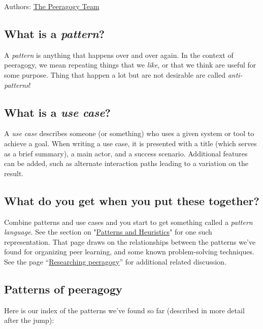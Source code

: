 Authors: \href{http://peeragogy.org/resources/meet-the-team/}{The
Peeragogy Team}

\subsection{What is a \emph{pattern}?}

A \emph{pattern} is anything that happens over and over again. In the
context of peeragogy, we mean repeating things that we \emph{like}, or
that we think are useful for some purpose. Thing that happen a lot but
are not desirable are called \emph{anti-patterns}!

\subsection{What is a \emph{use case}?}

A \emph{use case} describes someone (or something) who uses a given
system or tool to achieve a goal. When writing a use case, it is
presented with a title (which serves as a brief summary), a main actor,
and a success scenario. Additional features can be added, such as
alternate interaction paths leading to a variation on the result.

\subsection{What do you get when you put these together?}

Combine patterns and use cases and you start to get something called a
\emph{pattern language}. See the section on
"\href{http://peeragogy.org/patterns-usecases/patterns-and-heuristics/}{Patterns
and Heuristics}" for one such representation. That page draws on the
relationships between the patterns we've found for organizing peer
learning, and some known problem-solving techniques. See the page
``\href{http://peeragogy.org/researching-peeragogy/}{Researching
peeragogy}'' for additional related discussion.

\subsection{Patterns of peeragogy}

Here is our index of the patterns we've found so far (described in more
detail after the jump):

